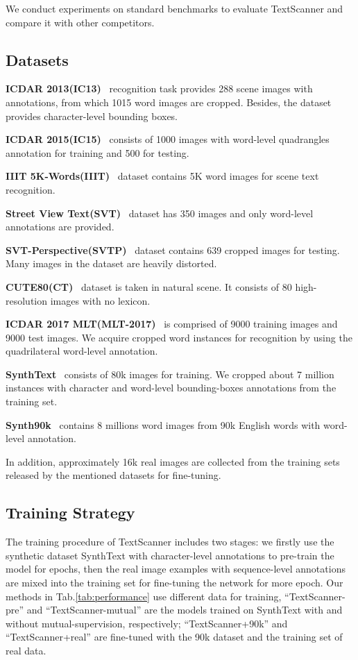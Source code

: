 \documentclass[letterpaper]{article} \usepackage{aaai20}  \usepackage{times}  \usepackage{helvet} \usepackage{courier}  \usepackage[hyphens]{url}  \usepackage{graphicx} \urlstyle{rm} \def\UrlFont{\rm}  \usepackage{graphicx}  \frenchspacing  \setlength{\pdfpagewidth}{8.5in}  \setlength{\pdfpageheight}{11in}
\begin{document}
We conduct experiments on standard benchmarks to evaluate TextScanner and compare it with other competitors.
\subsection{Datasets} \label{datasets}
\textbf{ICDAR 2013(IC13)}~\cite{ic13} recognition task provides 288 scene images with annotations, from which 1015 word images are cropped. Besides, the dataset provides character-level bounding boxes.

\noindent\textbf{ICDAR 2015(IC15)}~\cite{karatzas2015icdar}
consists of 1000 images with word-level quadrangles annotation for training and 500 for testing.

\noindent\textbf{IIIT 5K-Words(IIIT)}~\cite{mishra2012scene} dataset contains 5K word images for scene text recognition. 

\noindent\textbf{Street View Text(SVT)}~\cite{wang2011end} dataset
has 350 images and only word-level annotations are provided.

\noindent\textbf{SVT-Perspective(SVTP)}~\cite{quy2013recognizing} dataset contains 639 cropped images for testing. Many images in the dataset are heavily distorted. 

\noindent\textbf{CUTE80(CT)}~\cite{cute} dataset is taken in natural scene. It consists of 80 high-resolution images with no lexicon.

\noindent\textbf{ICDAR 2017 MLT(MLT-2017)}~\cite{nayef2017}
is comprised of 9000 training images and 9000 test images. We acquire cropped word instances for recognition by using the quadrilateral word-level annotation.

\noindent\textbf{SynthText}~\cite{synthtext} consists of 80k images for training. We cropped about 7 million instances with character and word-level bounding-boxes annotations from the training set.

\noindent\textbf{Synth90k}~\cite{mjsynth} contains 8 millions word images from 90k English words with word-level annotation.

In addition, approximately 16k real images are collected from the training sets released by the mentioned datasets for fine-tuning.

\subsection{Training Strategy}
The training procedure of TextScanner includes two stages: we firstly use the synthetic dataset SynthText with character-level annotations to pre-train the model for  epochs, then the real image examples with sequence-level annotations are mixed into the training set for fine-tuning the network for  more epoch. Our methods in Tab.\ref{tab:performance} use different data for training, ``TextScanner-pre'' and ``TextScanner-mutual'' are the models trained on SynthText with and without mutual-supervision, respectively; ``TextScanner+90k'' and ``TextScanner+real'' are fine-tuned with the 90k dataset and the training set of real data.
\end{document}
